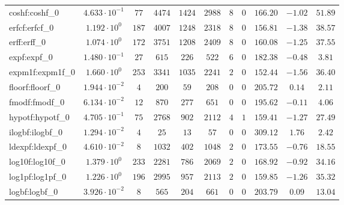 \begin{tabular}{|l|c|c|c|c|c|c|c|c|c|c|}
coshf:coshf\_0               & $ 4.633 \cdot 10^{-1} $ & $ 77     $ & $ 4474  $ & $ 1424  $ & $ 2988  $ & $ 8   $ & $ 0 $ & $ 166.20      $ & $ -1.02   $ & $ 51.89   $ \\
erfcf:erfcf\_0               & $ 1.192 \cdot 10^{0}  $ & $ 187    $ & $ 4007  $ & $ 1248  $ & $ 2318  $ & $ 8   $ & $ 0 $ & $ 156.81      $ & $ -1.38   $ & $ 38.57   $ \\
erff:erff\_0                 & $ 1.074 \cdot 10^{0}  $ & $ 172    $ & $ 3751  $ & $ 1208  $ & $ 2409  $ & $ 8   $ & $ 0 $ & $ 160.08      $ & $ -1.25   $ & $ 37.55   $ \\
expf:expf\_0                 & $ 1.480 \cdot 10^{-1} $ & $ 27     $ & $ 615   $ & $ 226   $ & $ 522   $ & $ 6   $ & $ 0 $ & $ 182.38      $ & $ -0.48   $ & $ 3.81    $ \\
expm1f:expm1f\_0             & $ 1.660 \cdot 10^{0}  $ & $ 253    $ & $ 3341  $ & $ 1035  $ & $ 2241  $ & $ 2   $ & $ 0 $ & $ 152.44      $ & $ -1.56   $ & $ 36.40   $ \\
floorf:floorf\_0             & $ 1.944 \cdot 10^{-2} $ & $ 4      $ & $ 200   $ & $ 59    $ & $ 208   $ & $ 0   $ & $ 0 $ & $ 205.72      $ & $ 0.14    $ & $ 2.11    $ \\
fmodf:fmodf\_0               & $ 6.134 \cdot 10^{-2} $ & $ 12     $ & $ 870   $ & $ 277   $ & $ 651   $ & $ 0   $ & $ 0 $ & $ 195.62      $ & $ -0.11   $ & $ 4.06    $ \\
hypotf:hypotf\_0             & $ 4.705 \cdot 10^{-1} $ & $ 75     $ & $ 2768  $ & $ 902   $ & $ 2112  $ & $ 4   $ & $ 1 $ & $ 159.41      $ & $ -1.27   $ & $ 27.49   $ \\
ilogbf:ilogbf\_0             & $ 1.294 \cdot 10^{-2} $ & $ 4      $ & $ 25    $ & $ 13    $ & $ 57    $ & $ 0   $ & $ 0 $ & $ 309.12      $ & $ 1.76    $ & $ 2.42    $ \\
ldexpf:ldexpf\_0             & $ 4.610 \cdot 10^{-2} $ & $ 8      $ & $ 1032  $ & $ 402   $ & $ 1048  $ & $ 2   $ & $ 0 $ & $ 173.55      $ & $ -0.76   $ & $ 18.55   $ \\
log10f:log10f\_0             & $ 1.379 \cdot 10^{0}  $ & $ 233    $ & $ 2281  $ & $ 786   $ & $ 2069  $ & $ 2   $ & $ 0 $ & $ 168.92      $ & $ -0.92   $ & $ 34.16   $ \\
log1pf:log1pf\_0             & $ 1.226 \cdot 10^{0}  $ & $ 196    $ & $ 2995  $ & $ 957   $ & $ 2113  $ & $ 2   $ & $ 0 $ & $ 159.85      $ & $ -1.26   $ & $ 35.32   $ \\
logbf:logbf\_0               & $ 3.926 \cdot 10^{-2} $ & $ 8      $ & $ 565   $ & $ 204   $ & $ 661   $ & $ 0   $ & $ 0 $ & $ 203.79      $ & $ 0.09    $ & $ 13.04   $ \\

\end{tabular}
